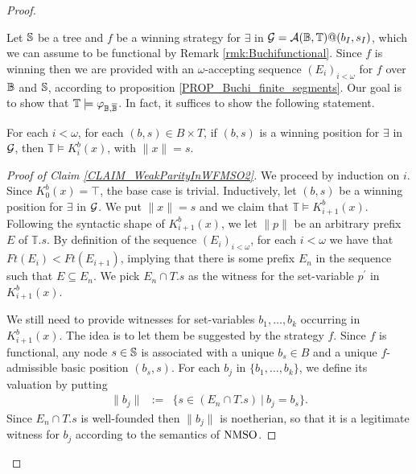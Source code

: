 \begin{proof} \begin{Iff-RL} Let $\mathbb{S}$ be a tree and $f$ be a winning strategy for $\exists$ in $\mathcal{G} = \mathcal{A}(\mathbb{B},\mathbb{T})@(b_I,s_I)$, which we can assume to be functional by Remark \ref{rmk:Buchifunctional}. Since $f$ is winning then we are provided with an $\omega$-accepting sequence $(E_i)_{i < \omega}$ for $f$ over $\mathbb{B}$ and $\mathbb{S}$, according to proposition \ref{PROP_Buchi_finite_segments}. Our goal is to show that $\mathbb{T} \models \varphi_{\mathbb{B},\overline{\mathbb{B}}}$. In fact, it suffices to show the following statement.

\smallskip

\begin{claim}\label{CLAIM_WeakParityInWFMSO2} For each $i < \omega$, for each $(b,s)\in B\times T$, if $(b,s)$ is a winning position for $\exists$ in $\mathcal{G}$, then $\mathbb{T} \models K_i^{b}(x)$, with $\|x\| = s$. \end{claim}

\begin{proof}[Proof of Claim \ref{CLAIM_WeakParityInWFMSO2}]
We proceed by induction on $i$. Since $K_0^{b}(x) = \top$, the base case is trivial. Inductively, let $(b,s)$ be a winning position for $\exists$ in $\mathcal{G}$. We put $\|x\| = s$ and we claim that $\mathbb{T} \models K_{i+1}^{b}(x)$. Following the syntactic shape of $K_{i+1}^{b}(x)$, we let $\|p\|$ be an arbitrary prefix $E$ of $\mathbb{T}.s$. By definition of the sequence $(E_i)_{i < \omega}$, for each $i < \omega$ we have that $\mathit{Ft}(E_i) < \mathit{Ft}(E_{i+1})$, implying that there is some prefix $E_n$ in the sequence such that $E \subseteq E_n$. We pick $E_n \cap {T.s}$ as the witness for the set-variable $p^{\prime}$ in $K_{i+1}^{b}(x)$.

We still need to provide witnesses for set-variables $b_1,\dots,b_k$ occurring in $K_{i+1}^{b}(x)$. The idea is to let them be suggested by the strategy $f$. Since $f$ is functional, any node $s \in \mathbb{S}$ is associated with a unique $b_s \in B$ and a unique $f$-admissible basic position $(b_s,s)$. For each $b_j$ in $\{b_1,\dots,b_k\}$, we define its valuation by putting
\begin{eqnarray}\label{EQ_b_j_eval}
  \|b_j\| &:=& \{s \in (E_n \cap T.s)\ |\ b_j = b_s\}.
\end{eqnarray}
Since $E_n \cap T.s$ is well-founded then $\|b_j\|$ is noetherian, so that it is a legitimate witness for $b_j$ according to the semantics of $\mathrm{NMSO}$.


\end{proof}
\end{Iff-RL}
\end{proof}
